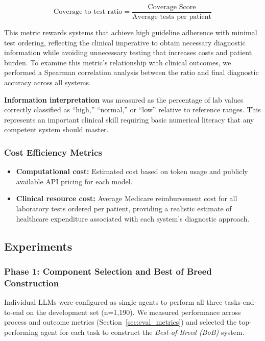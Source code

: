 \documentclass[manuscript, nonacm]{acmart}
\begin{document}
\begin{itemize}
$$\text{Coverage-to-test ratio} = \frac{\text{Coverage Score}}{\text{Average tests per patient}}$$

This metric rewards systems that achieve high guideline adherence with minimal test ordering, reflecting the clinical imperative to obtain necessary diagnostic information while avoiding unnecessary testing that increases costs and patient burden. To examine this metric's relationship with clinical outcomes, we performed a Spearman correlation analysis between the ratio and final diagnostic accuracy across all systems.
\end{itemize}

\textbf{Information interpretation} was measured as the percentage of lab values correctly classified as ``high,'' ``normal,'' or ``low'' relative to reference ranges. This represents an important clinical skill requiring basic numerical literacy that any competent system should master.

\subsubsection{Cost Efficiency Metrics}
\begin{itemize}
    \item \textbf{Computational cost:} Estimated cost based on token usage and publicly available API pricing for each model.
    
    \item \textbf{Clinical resource cost:} Average Medicare reimbursement cost for all laboratory tests ordered per patient, providing a realistic estimate of healthcare expenditure associated with each system's diagnostic approach. \cite{cms2025clabq2}
\end{itemize}

\subsection{Experiments}

\subsubsection{\textbf{Phase 1: Component Selection and Best of Breed Construction}}  

Individual LLMs were configured as single agents to perform all three tasks end-to-end on the development set (n=1,190). We measured performance across process and outcome metrics (Section~\ref{sec:eval_metrics}) and selected the top-performing agent for each task to construct the \textit{Best-of-Breed (BoB)} system.
\end{document}
